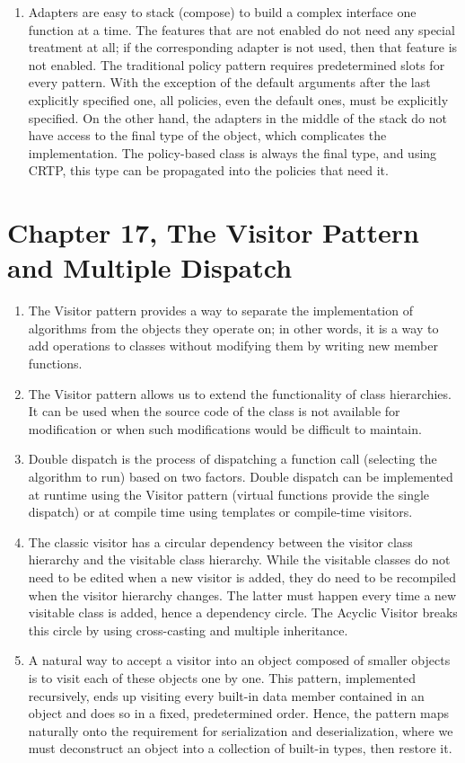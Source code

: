 \begin{enumerate}
\item
  Adapters are easy to stack (compose) to build a complex interface one function at a time. The features that are not enabled do not need any special treatment at all; if the corresponding adapter is not used, then that feature is not enabled. The traditional policy pattern requires predetermined slots for every pattern. With the exception of the default arguments after the last explicitly specified one, all policies, even the default ones, must be explicitly specified. On the other hand, the adapters in the middle of the stack do not have access to the final type of the object, which complicates the implementation. The policy-based class is always the final type, and using CRTP, this type can be propagated into the policies that need it.
\end{enumerate}

\section{Chapter 17, The Visitor Pattern and Multiple Dispatch}

\begin{enumerate}
\item
  The Visitor pattern provides a way to separate the implementation of algorithms from the objects they operate on; in other words, it is a way to add operations to classes without modifying them by writing new member functions.
\item
  The Visitor pattern allows us to extend the functionality of class hierarchies. It can be used when the source code of the class is not available for modification or when such modifications would be difficult to maintain.
\item
  Double dispatch is the process of dispatching a function call (selecting the algorithm to run) based on two factors. Double dispatch can be implemented at runtime using the Visitor pattern (virtual functions provide the single dispatch) or at compile time using templates or compile-time visitors.
\item
  The classic visitor has a circular dependency between the visitor class hierarchy and the visitable class hierarchy. While the visitable classes do not need to be edited when a new visitor is added, they do need to be recompiled when the visitor hierarchy changes. The latter must happen every time a new visitable class is added, hence a dependency circle. The Acyclic Visitor breaks this circle by using cross-casting and multiple inheritance.
\item
  A natural way to accept a visitor into an object composed of smaller objects is to visit each of these objects one by one. This pattern, implemented recursively, ends up visiting every built-in data member contained in an object and does so in a fixed, predetermined order. Hence, the pattern maps naturally onto the requirement for serialization and deserialization, where we must deconstruct an object into a collection of built-in types, then restore it.
\end{enumerate}

